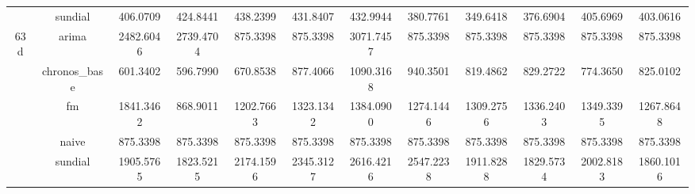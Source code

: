 \begin{table}[H]
{\begin{tabular}{cccccccccccc}
 & sundial & 406.0709 & 424.8441 & 438.2399 & 431.8407 & 432.9944 & 380.7761 & 349.6418 & 376.6904 & 405.6969 & 403.0616 \\
\multirow[c]{5}{*}{63d} & arima & 2482.6046 & 2739.4704 & 875.3398 & 875.3398 & 3071.7457 & 875.3398 & 875.3398 & 875.3398 & 875.3398 & 875.3398 \\
 & chronos_base & 601.3402 & 596.7990 & 670.8538 & 877.4066 & 1090.3168 & 940.3501 & 819.4862 & 829.2722 & 774.3650 & 825.0102 \\
 & fm & 1841.3462 & 868.9011 & 1202.7663 & 1323.1342 & 1384.0900 & 1274.1446 & 1309.2756 & 1336.2403 & 1349.3395 & 1267.8648 \\
 & naive & 875.3398 & 875.3398 & 875.3398 & 875.3398 & 875.3398 & 875.3398 & 875.3398 & 875.3398 & 875.3398 & 875.3398 \\
 & sundial & 1905.5765 & 1823.5215 & 2174.1596 & 2345.3127 & 2616.4216 & 2547.2238 & 1911.8288 & 1829.5734 & 2002.8183 & 1860.1016 \\
\bottomrule
\end{tabular}

 }
\end{table}